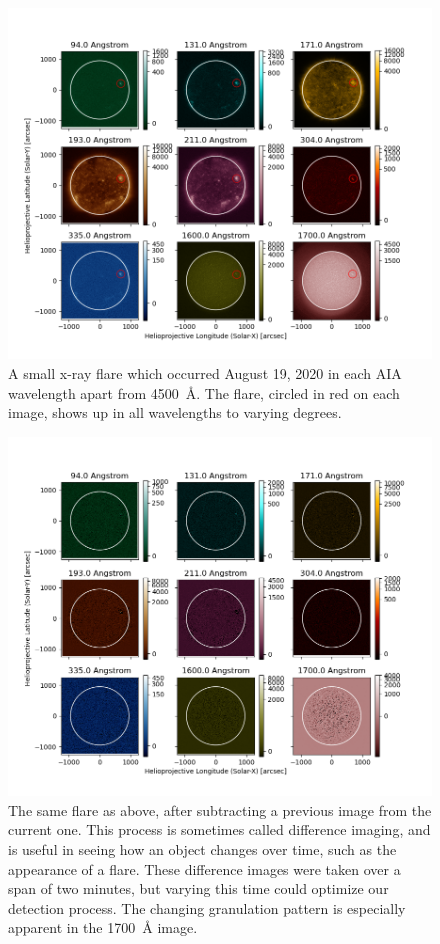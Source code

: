 \documentclass[12pt, letterpaper]{article}
\begin{document}
\begin{figure}[h]
	\includegraphics[width=7in]{figures/0819_flare_labeled.png}
	\centering
	\caption{A small x-ray flare which occurred August 19, 2020 in each AIA wavelength apart from 4500~\AA{}. The flare, circled in red on each image, shows up in all wavelengths to varying degrees.}
	\label{flare}
\end{figure}

\begin{figure}[h]
	\includegraphics[width=7in]{figures/0819_flare_diff.png}
	\centering
	\caption{The same flare as above, after subtracting a previous image from the current one. This process is sometimes called difference imaging, and is useful in seeing how an object changes over time, such as the appearance of a flare. These difference images were taken over a span of two minutes, but varying this time could optimize our detection process. The changing granulation pattern is especially apparent in the 1700~\AA{} image.}
	\label{flare_diff}
\end{figure}
\end{document}
